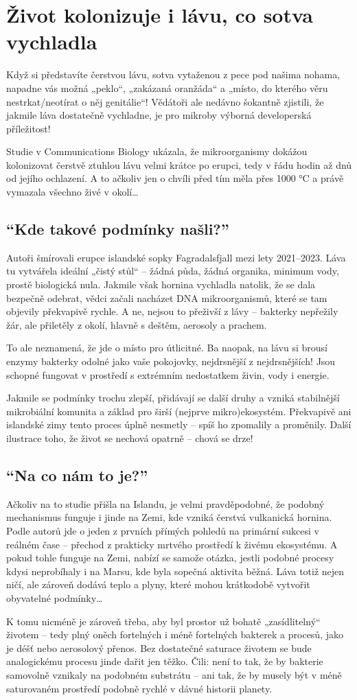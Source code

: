 \documentclass[main.tex]{subfiles}
\begin{document}
\section{Život kolonizuje i lávu, co sotva vychladla}
Když si představíte čerstvou lávu, sotva vytaženou z pece pod našima nohama, napadne vás možná „peklo“, „zakázaná oranžáda“ a „místo, do kterého věru nestrkat/neotírat o něj genitálie“! Vědátoři ale nedávno šokantně zjistili, že jakmile láva dostatečně vychladne, je pro mikroby výborná developerská příležitost!\par
Studie v Communications Biology ukázala, že mikroorganismy dokážou kolonizovat čerstvě ztuhlou lávu velmi krátce po erupci, tedy v řádu hodin až dnů od jejího ochlazení. A to ačkoliv jen o chvíli před tím měla přes 1000 °C a právě vymazala všechno živé v okolí…
\subsection*{\enquote{Kde takové podmínky našli?}}
Autoři šmírovali erupce islandské sopky Fagradalsfjall mezi lety 2021–2023. Láva tu vytvářela ideální „čistý stůl“ – žádná půda, žádná organika, minimum vody, prostě biologická nula. Jakmile však hornina vychladla natolik, že se dala bezpečně odebrat, vědci začali nacházet DNA mikroorganismů, které se tam objevily překvapivě rychle. A ne, nejsou to přeživší z lávy – bakterky nepřežily žár, ale přiletěly z okolí, hlavně s deštěm, aerosoly a prachem.\par
To ale neznamená, že jde o místo pro útlicitné. Ba naopak, na lávu si brousí enzymy bakterky odolné jako vaše pokojovky, nejdrsnější z nejdrsnějších! Jsou schopné fungovat v prostředí s extrémním nedostatkem živin, vody i energie.\par Jakmile se podmínky trochu zlepší, přidávají se další druhy a vzniká stabilnější mikrobiální komunita a základ pro širší (nejprve mikro)ekosystém. Překvapivě ani islandské zimy tento proces úplně nesmetly – spíš ho zpomalily a proměnily. Další ilustrace toho, že život se nechová opatrně – chová se drze!
\subsection*{\enquote{Na co nám to je?}}
Ačkoliv na to studie přišla na Islandu, je velmi pravděpodobné, že podobný mechanismus funguje i jinde na Zemi, kde vzniká čerstvá vulkanická hornina. Podle autorů jde o jeden z prvních přímých pohledů na primární sukcesi v reálném čase – přechod z prakticky mrtvého prostředí k živému ekosystému. A pokud tohle funguje na Zemi, nabízí se samože otázka, jestli podobné procesy kdysi neprobíhaly i na Marsu, kde byla sopečná aktivita běžná. Láva totiž nejen ničí, ale zároveň dodává teplo a plyny, které mohou krátkodobě vytvořit obyvatelné podmínky…\par
K tomu nicméně je zároveň třeba, aby byl prostor už bohatě „zasídlitelný“ životem – tedy plný oněch fortelných i méně fortelných bakterek a procesů, jako je déšť nebo aerosolový přenos. Bez dostatečné saturace životem se bude analogickému procesu jinde dařit jen těžko. Čili: není to tak, že by bakterie samovolně vznikaly na podobném substrátu – ani tak, že by musely být v méně saturovaném prostředí podobně rychlé v dávné historii planety.
\end{document}
